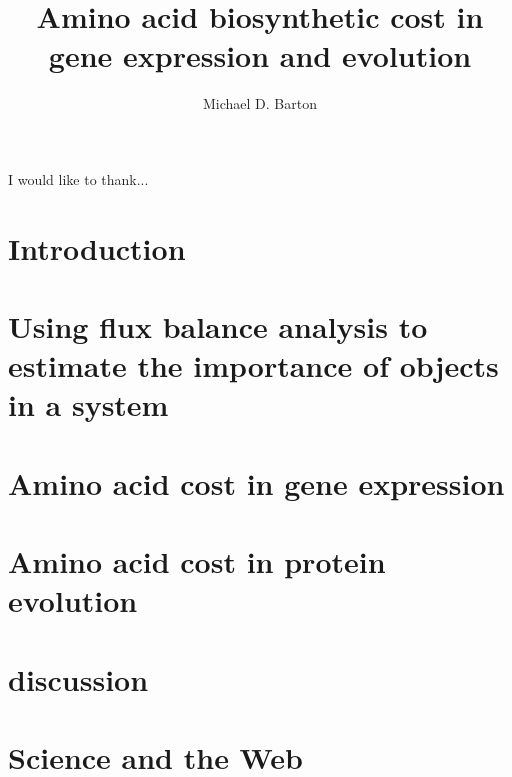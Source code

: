 \documentclass[12pt,PhD]{muthesis}
\begin{document}
\title{Amino acid biosynthetic cost in gene expression and evolution}
\author{Michael D. Barton}

\beforeabstract
{}

\afterabstract
{}
I would like to thank...
\afterpreface


\chapter{Introduction}

\chapter{Using flux balance analysis to estimate the importance of objects in a system}

\chapter{Amino acid cost in gene expression}

\chapter{Amino acid cost in protein evolution}

\chapter{discussion}

\chapter{Science and the Web}

\end{document}
